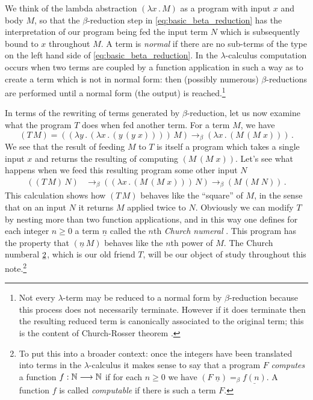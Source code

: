 \documentclass[english,letter paper,12pt,reqno]{article}
\theoremstyle{example}
\numberwithin{equation}{section}
\begin{document}
We think of the lambda abstraction $(\lambda x \,.\, M)$ as a program with input $x$ and body $M$, so that the $\beta$-reduction step in \eqref{eq:basic_beta_reduction} has the interpretation of our program being fed the input term $N$ which is subsequently bound to $x$ throughout $M$. A term is \emph{normal} if there are no sub-terms of the type on the left hand side of \eqref{eq:basic_beta_reduction}. In the $\lambda$-calculus computation occurs when two terms are coupled by a function application in such a way as to create a term which is not in normal form: then (possibly numerous) $\beta$-reductions are performed until a normal form (the output) is reached.\footnote{Not every $\lambda$-term may be reduced to a normal form by $\beta$-reduction because this process does not necessarily terminate. However if it does terminate then the resulting reduced term is canonically associated to the original term; this is the content of Church-Rosser theorem \cite[\S 4.2]{selinger}.}

In terms of the rewriting of terms generated by $\beta$-reduction, let us now examine what the program $T$ does when fed another term. For a term $M$, we have
\begin{equation}\label{eq:beta_reduc_dup}
(T \, M) = (( \lambda y \,.\, ( \lambda x \,.\, (y \,(y \; x))))\, M) \longrightarrow_\beta (\lambda x \, . \, (M \, (M \; x)))\,.
\end{equation}
We see that the result of feeding $M$ to $T$ is itself a program which takes a single input $x$ and returns the resulting of computing $(M \, (M \; x))$. Let's see what happens when we feed this resulting program some other input $N$
\begin{align*}
((T \, M) \, N) &\longrightarrow_\beta ((\lambda x \, . \, (M \, (M \; x))) \, N) \longrightarrow_\beta (M \, (M \; N))\,.
\end{align*}
This calculation shows how $(T \, M)$ behaves like the ``square'' of $M$, in the sense that on an input $N$ it returns $M$ applied twice to $N$. Obviously we can modify $T$ by nesting more than two function applications, and in this way one defines for each integer $n \ge 0$ a term $\underline{n}$ called the $n$th \emph{Church numeral} \cite[\S 3.2]{selinger}. This program has the property that $(\underline{n} \, M)$ behaves like the $n$th power of $M$. The Church numberal $\underline{2}$, which is our old friend $T$, will be our object of study throughout this note.\footnote{To put this into a broader context: once the integers have been translated into terms in the $\lambda$-calculus it makes sense to say that a program $F$ \emph{computes} a function $f: \mathbb{N} \longrightarrow \mathbb{N}$ if for each $n \ge 0$ we have $(F \; \underline{n}) =_\beta \underline{f(n)}$. A function $f$ is called \emph{computable} if there is such a term $F$.}
\\
\end{document}
